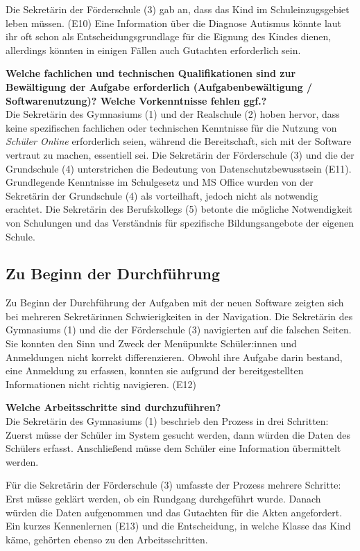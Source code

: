 Die Sekretärin der Förderschule (3) gab an, dass das Kind im Schuleinzugsgebiet leben müssen. (E10) Eine Information über die Diagnose Autismus könnte laut ihr oft schon als Entscheidungsgrundlage für die Eignung des Kindes dienen, allerdings könnten in einigen Fällen auch Gutachten erforderlich sein.

\textbf{Welche fachlichen und technischen Qualifikationen sind zur Bewältigung der Aufgabe erforderlich (Aufgabenbewältigung / Softwarenutzung)? Welche Vorkenntnisse fehlen ggf.?}\\
Die Sekretärin des Gymnasiums (1) und der Realschule (2) hoben hervor, dass keine spezifischen fachlichen oder technischen Kenntnisse für die Nutzung von \textit{Schüler Online} erforderlich seien, während die Bereitschaft, sich mit der Software vertraut zu machen, essentiell sei. Die Sekretärin der Förderschule (3) und die der Grundschule (4) unterstrichen die Bedeutung von Datenschutzbewusstsein (E11). Grundlegende Kenntnisse im Schulgesetz und MS Office wurden von der Sekretärin der Grundschule (4) als vorteilhaft, jedoch nicht als notwendig erachtet. Die Sekretärin des Berufskollegs (5) betonte die mögliche Notwendigkeit von Schulungen und das Verständnis für spezifische Bildungsangebote der eigenen Schule.

\subsection{Zu Beginn der Durchführung}
Zu Beginn der Durchführung der Aufgaben mit der neuen Software zeigten sich bei mehreren Sekretärinnen Schwierigkeiten in der Navigation. Die Sekretärin des Gymnasiums (1) und die der Förderschule (3) navigierten auf die falschen Seiten. Sie konnten den Sinn und Zweck der Menüpunkte \glqq Schüler:innen\grqq{} und \glqq Anmeldungen\grqq{} nicht korrekt differenzieren. Obwohl ihre Aufgabe darin bestand, eine Anmeldung zu erfassen, konnten sie aufgrund der bereitgestellten Informationen nicht richtig navigieren. (E12)

\textbf{Welche Arbeitsschritte sind durchzuführen?}\\
Die Sekretärin des Gymnasiums (1) beschrieb den Prozess in drei Schritten: Zuerst müsse der Schüler im System gesucht werden, dann würden die Daten des Schülers erfasst. Anschließend müsse dem Schüler eine Information übermittelt werden.

Für die Sekretärin der Förderschule (3) umfasste der Prozess mehrere Schritte: Erst müsse geklärt werden, ob ein Rundgang durchgeführt wurde. Danach würden die Daten aufgenommen und das Gutachten für die Akten angefordert. Ein kurzes Kennenlernen (E13) und die Entscheidung, in welche Klasse das Kind käme, gehörten ebenso zu den Arbeitsschritten. 


